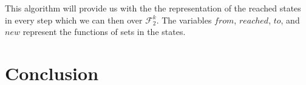 \documentclass[12pt]{report}
\begin{document}
This algorithm will provide us with the the representation of the reached states in every step which we can then over $\mathcal{F}_2^k$. The variables $from$, $reached$, $to$, and $new$ represent the functions of sets in the states.

\section{Conclusion}




\end{document}
